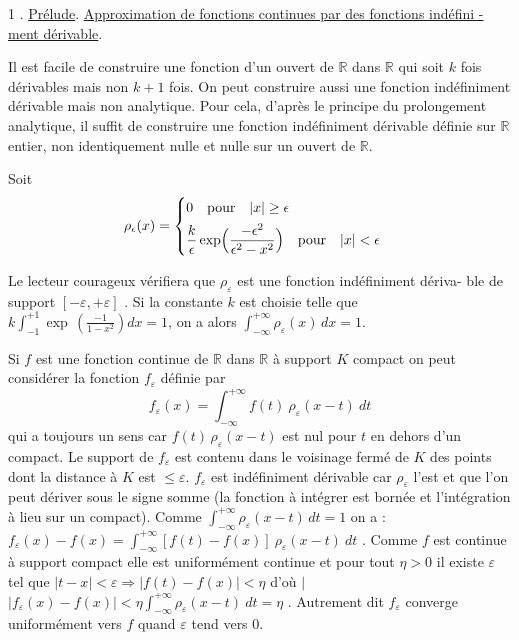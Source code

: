 \documentclass[11pt]{article}
\newcommand{\scanpage}[1]{\par\bigskip\noindent{\small\sffamily[scan #1]}\par}
\newcommand{\mspage}[1]{{\small\sffamily[p.\,#1]}}
\newcommand{\hand}[1]{\textcolor{blue}{#1}}
\newcommand{\uline}[1]{\underline{#1}}
\begin{document}
1 . \uline{Prélude}. \uline{Approximation de fonctions continues par des fonctions indéfini -}
\uline{ment dérivable}.

Il est facile de construire une fonction d'un ouvert de $\mathbb{R}$ dans $\mathbb{R}$
qui soit $k$ fois dérivables mais non $k+1$ fois. On peut construire aussi une
fonction indéfiniment dérivable mais non analytique. Pour cela, d'après le
principe du prolongement analytique, il suffit de construire une fonction
indéfiniment dérivable définie sur $\mathbb{R}$ entier, non identiquement nulle et
nulle sur un ouvert de $\mathbb{R}$.

Soit
\[
\rho_{\epsilon}(x) = \begin{cases} 0 \quad \text{pour} \quad |x| \geq \epsilon \\[4pt] \dfrac{k}{\epsilon}\exp\Bigl(\dfrac{-\epsilon^{2}}{\epsilon^{2}-x^{2}}\Bigr) \quad \text{pour} \quad |x| < \epsilon \end{cases}
\]

\mspage{\hand{162}}

\clearpage
\scanpage{119/163}
\mspage{- 2 -}

Le lecteur courageux vérifiera que $\rho_\varepsilon$ est une fonction indéfiniment dériva-%
ble de support $[-\varepsilon,+\varepsilon]$ . Si la constante $k$ est choisie telle que
$k\int_{-1}^{+1} \exp\,(\frac{-1}{1-x^2})dx = 1$, on a alors $\int_{-\infty}^{+\infty} \rho_\varepsilon(x)\,dx = 1$.

Si $f$ est une fonction continue de $\mathbb{R}$ dans $\mathbb{R}$ à support $K$ compact on peut
considérer la fonction $f_\varepsilon$ définie par
\[ f_\varepsilon(x) = \int_{-\infty}^{+\infty} f(t)\ \rho_\varepsilon(x-t)\ dt \]
qui a toujours un sens car $f(t)\,\rho_\varepsilon(x-t)$ est nul pour $t$ en dehors d'un
compact. Le support de $f_\varepsilon$ est contenu dans le voisinage fermé de $K$ des
points dont la distance à $K$ est $\leq \varepsilon$. $f_\varepsilon$ est indéfiniment dérivable car
$\rho_\varepsilon$ l'est et que l'on peut dériver sous le signe somme (la fonction à intégrer
est bornée et l'intégration à lieu sur un compact). Comme $\int_{-\infty}^{+\infty} \rho_\varepsilon(x-t)\,dt = 1$
on a : $f_\varepsilon(x) - f(x) = \int_{-\infty}^{+\infty} [f(t) - f(x)]\ \rho_\varepsilon(x-t)\ dt$ . Comme $f$ est continue
à support compact elle est uniformément continue et pour tout $\eta > 0$ il
existe $\varepsilon$ tel que $|t-x| < \varepsilon \Rightarrow |f(t) - f(x)| < \eta$ d'où $|$
$|f_\varepsilon(x) - f(x)| < \eta \int_{-\infty}^{+\infty} \rho_\varepsilon(x-t)\ dt = \eta$ .
Autrement dit $f_\varepsilon$ converge uniformément vers $f$ quand $\varepsilon$ tend vers $0$.
\end{document}
